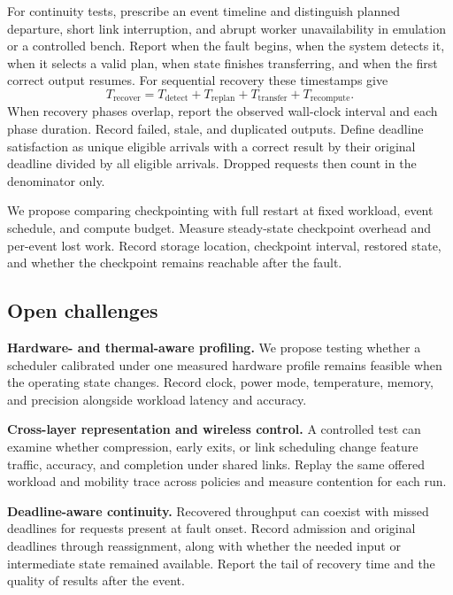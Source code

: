 \documentclass[pdflatex,sn-vancouver-num]{sn-jnl}
\begin{document}
For continuity tests, prescribe an event timeline and distinguish planned departure, short link interruption, and abrupt worker unavailability in emulation or a controlled bench. Report when the fault begins, when the system detects it, when it selects a valid plan, when state finishes transferring, and when the first correct output resumes. For sequential recovery these timestamps give
\begin{equation}\label{eq:recovery}
T_{\mathrm{recover}}=T_{\mathrm{detect}}+T_{\mathrm{replan}}
 +T_{\mathrm{transfer}}+T_{\mathrm{recompute}}.
\end{equation}
When recovery phases overlap, report the observed wall-clock interval and each phase duration. Record failed, stale, and duplicated outputs. Define deadline satisfaction as unique eligible arrivals with a correct result by their original deadline divided by all eligible arrivals. Dropped requests then count in the denominator only.

We propose comparing checkpointing with full restart at fixed workload, event schedule, and compute budget. Measure steady-state checkpoint overhead and per-event lost work. Record storage location, checkpoint interval, restored state, and whether the checkpoint remains reachable after the fault.

\subsection{Open challenges}
\textbf{Hardware- and thermal-aware profiling.}
We propose testing whether a scheduler calibrated under one measured hardware profile remains feasible when the operating state changes. Record clock, power mode, temperature, memory, and precision alongside workload latency and accuracy.

\textbf{Cross-layer representation and wireless control.}
A controlled test can examine whether compression, early exits, or link scheduling change feature traffic, accuracy, and completion under shared links. Replay the same offered workload and mobility trace across policies and measure contention for each run.

\textbf{Deadline-aware continuity.}
Recovered throughput can coexist with missed deadlines for requests present at fault onset. Record admission and original deadlines through reassignment, along with whether the needed input or intermediate state remained available. Report the tail of recovery time and the quality of results after the event.
\end{document}
